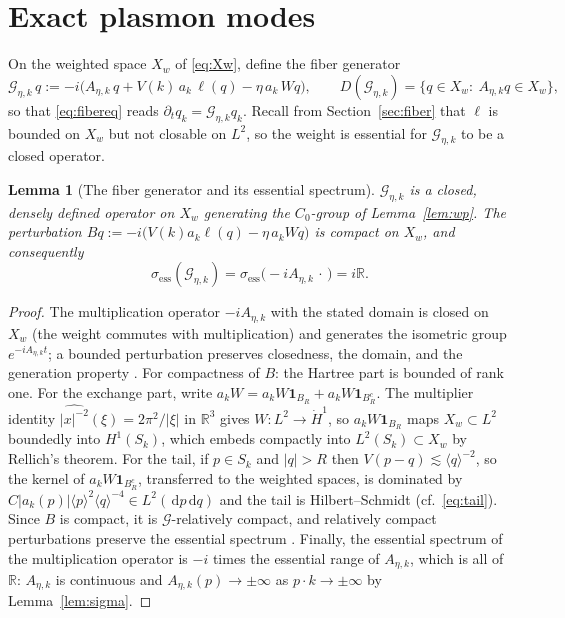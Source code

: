 \documentclass[11pt,a4paper]{amsart}
\newtheorem{lemma}[theorem]{Lemma}
\theoremstyle{definition}
\theoremstyle{remark}
\newcommand{\R}{\mathbb{R}}
\newcommand{\dd}{\,\mathrm{d}}
\newcommand{\ellf}{\ell}
\newcommand{\sG}{\mathcal{G}}
\begin{document}
\section{Exact plasmon modes}\label{sec:modes}

On the weighted space $X_w$ of \eqref{eq:Xw}, define the fiber generator
\begin{equation}\label{eq:generator}
\sG_{\eta,k}\,q:=-i\bigl(A_{\eta,k}\,q+V(k)\,a_k\,\ellf(q)-\eta\,a_k\,Wq\bigr),
\qquad D(\sG_{\eta,k})=\{q\in X_w:\ A_{\eta,k}q\in X_w\},
\end{equation}
so that \eqref{eq:fibereq} reads $\partial_tq_k=\sG_{\eta,k}q_k$. Recall from Section~\ref{sec:fiber} that $\ellf$ is bounded on $X_w$ but not closable on $L^2$, so the weight is essential for $\sG_{\eta,k}$ to be a closed operator.

\begin{lemma}[The fiber generator and its essential spectrum]\label{lem:generator}
$\sG_{\eta,k}$ is a closed, densely defined operator on $X_w$ generating the $C_0$-group of Lemma~\ref{lem:wp}. The perturbation $Bq:=-i\bigl(V(k)a_k\ellf(q)-\eta\,a_kWq\bigr)$ is compact on $X_w$, and consequently
\[
\sigma_{\mathrm{ess}}(\sG_{\eta,k})=\sigma_{\mathrm{ess}}\bigl(-iA_{\eta,k}\,\cdot\,\bigr)=i\R .
\]
\end{lemma}

\begin{proof}
The multiplication operator $-iA_{\eta,k}$ with the stated domain is closed on $X_w$ (the weight commutes with multiplication) and generates the isometric group $e^{-iA_{\eta,k}t}$; a bounded perturbation preserves closedness, the domain, and the generation property \cite{Kato}. For compactness of $B$: the Hartree part is bounded of rank one. For the exchange part, write $a_kW=a_kW\mathbf 1_{B_R}+a_kW\mathbf 1_{B_R^c}$. The multiplier identity $\widehat{|x|^{-2}}(\xi)=2\pi^2/|\xi|$ in $\R^3$ gives $W:L^2\to\dot H^1$, so $a_kW\mathbf 1_{B_R}$ maps $X_w\subset L^2$ boundedly into $H^1(S_k)$, which embeds compactly into $L^2(S_k)\subset X_w$ by Rellich's theorem. For the tail, if $p\in S_k$ and $|q|>R$ then $V(p-q)\lesssim\langle q\rangle^{-2}$, so the kernel of $a_kW\mathbf 1_{B_R^c}$, transferred to the weighted spaces, is dominated by $C|a_k(p)|\langle p\rangle^{2}\langle q\rangle^{-4}\in L^2(\dd p\dd q)$ and the tail is Hilbert--Schmidt \textup{(}cf.\ \eqref{eq:tail}\textup{)}. Since $B$ is compact, it is $\sG$-relatively compact, and relatively compact perturbations preserve the essential spectrum \cite[Theorem~IV.5.35]{Kato}. Finally, the essential spectrum of the multiplication operator is $-i$ times the essential range of $A_{\eta,k}$, which is all of $\R$: $A_{\eta,k}$ is continuous and $A_{\eta,k}(p)\to\pm\infty$ as $p\cdot k\to\pm\infty$ by Lemma~\ref{lem:sigma}.
\end{proof}
\end{document}
